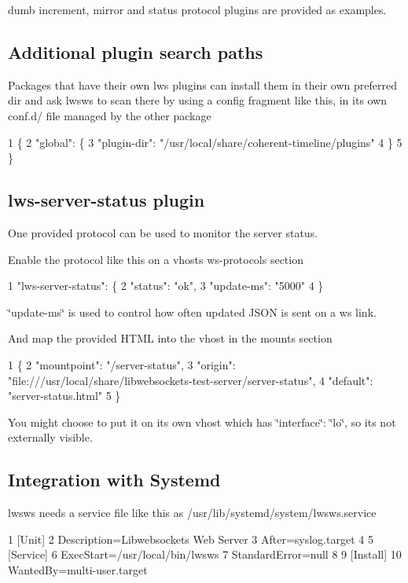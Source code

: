 dumb increment, mirror and status protocol plugins are provided as examples.

\subsection*{Additional plugin search paths }

Packages that have their own lws plugins can install them in their own preferred dir and ask lwsws to scan there by using a config fragment like this, in its own conf.\+d/ file managed by the other package 
\begin{DoxyCode}
1 \{
2   "global": \{
3    "plugin-dir": "/usr/local/share/coherent-timeline/plugins"
4   \}
5 \}
\end{DoxyCode}


\subsection*{lws-\/server-\/status plugin }

One provided protocol can be used to monitor the server status.

Enable the protocol like this on a vhost\textquotesingle{}s ws-\/protocols section 
\begin{DoxyCode}
1 "lws-server-status": \{
2   "status": "ok",
3   "update-ms": "5000"
4 \}
\end{DoxyCode}
 \char`\"{}update-\/ms\char`\"{} is used to control how often updated J\+S\+ON is sent on a ws link.

And map the provided H\+T\+ML into the vhost in the mounts section 
\begin{DoxyCode}
1 \{
2  "mountpoint": "/server-status",
3  "origin": "file:///usr/local/share/libwebsockets-test-server/server-status",
4  "default": "server-status.html"
5 \}
\end{DoxyCode}
 You might choose to put it on its own vhost which has \char`\"{}interface\char`\"{}\+: \char`\"{}lo\char`\"{}, so it\textquotesingle{}s not externally visible.

\subsection*{Integration with Systemd }

lwsws needs a service file like this as {\ttfamily /usr/lib/systemd/system/lwsws.service} 
\begin{DoxyCode}
1 [Unit]
2 Description=Libwebsockets Web Server
3 After=syslog.target
4 
5 [Service]
6 ExecStart=/usr/local/bin/lwsws
7 StandardError=null
8 
9 [Install]
10 WantedBy=multi-user.target
\end{DoxyCode}


